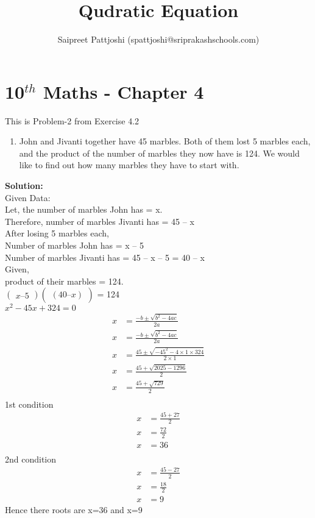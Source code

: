 \documentclass[12pt]{article}
\title{Qudratic Equation}
\author{Saipreet Pattjoshi (spattjoshi@sriprakashschools.com)}
\newcommand{\myvec}[1]{\ensuremath{\begin{pmatrix}#1\end{pmatrix}}}
\newcommand{\solution}{\noindent \textbf{Solution: }}
\begin{document}
\maketitle
\section*{10$^{th}$ Maths - Chapter 4}
This is Problem-2 from Exercise 4.2
\begin{enumerate}
\item John and Jivanti together have 45 marbles. Both of them lost 5 marbles each, and the product of the number of marbles they now have is 124. We would like to find out how many marbles they have to start with.
\end{enumerate}
\solution \\
Given Data:\\
Let, the number of marbles John has = x.\\
Therefore, number of marbles Jivanti has = 45 – x\\
After losing 5 marbles each,\\
Number of marbles John has = x – 5\\
Number of marbles Jivanti has = 45 – x – 5 = 40 – x\\
Given,\\
 product of their marbles = 124.\\
\myvec{x – 5}\myvec{(40 – x)} = 124\\
${x^2-45x+324=0}$ 
\begin{align}
x &=\frac{-b\pm\sqrt{b^2-4ac}}{2a}\\
x &=\frac{-b\pm\sqrt{b^2-4ac}}{2a}\\
x &=\frac{45\pm\sqrt{-45^2-4 \times 1\times324}}{2 \times 1}\\
x &=\frac{45+\sqrt{2025-1296}}{2}\\
x &=\frac{45+\sqrt{729}}{2}\\
\end{align}
1st condition\\
\begin{align}
x &=\frac{45+27}{2}\\
x &=\frac{72}{2}\\
x &=36\\
\end{align}
2nd condition\\
\begin{align}
x &=\frac{45-27}{2}\\
x &=\frac{18}{2}\\
x &=9
\end{align}
Hence there roots are x=36 and x=9
\end{document}
